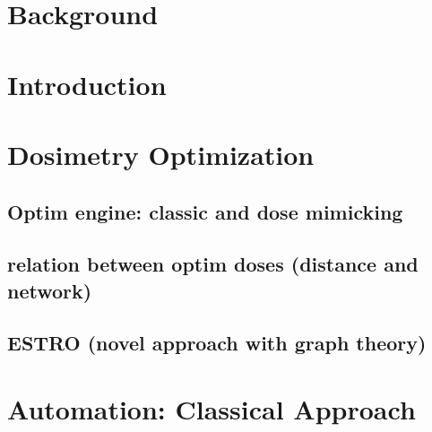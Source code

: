 \documentclass[a4paper]{book}
\begin{document}
	
	
	
	
	
	
	
	\listoffigures
	\listoftables
	\tableofcontents
	\chapterStyleToC
	
	
	
	\chapter{Background}
	\begin{chapterabstract}
		
	\end{chapterabstract}
	\clearpage
	\localtableofcontents
	
	
	\chapter{Introduction}
	\begin{chapterabstract}
		
	\end{chapterabstract}
	\clearpage
	\localtableofcontents
	
	
	\chapter{Dosimetry Optimization}
	\begin{chapterabstract}
	\end{chapterabstract}
	\clearpage
	\localtableofcontents
	\section{Optim engine: classic and dose mimicking}
	\section{relation between optim doses (distance and network)}
	\section{ESTRO (novel approach with graph theory)}
	
	\chapter{Automation: Classical Approach}
	\begin{chapterabstract}
	\end{chapterabstract}
	\clearpage
	\localtableofcontents
\end{document}
